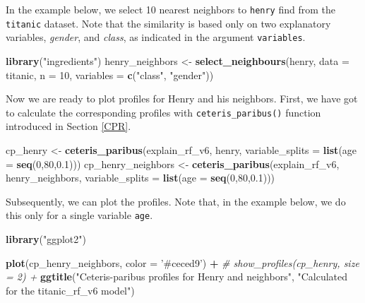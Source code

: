\documentclass[12pt,]{krantz}
\newenvironment{Shaded}{\begin{snugshade}}{\end{snugshade}}
\newcommand{\CommentTok}[1]{\textcolor[rgb]{0.56,0.35,0.01}{\textit{#1}}}
\newcommand{\DataTypeTok}[1]{\textcolor[rgb]{0.13,0.29,0.53}{#1}}
\newcommand{\DecValTok}[1]{\textcolor[rgb]{0.00,0.00,0.81}{#1}}
\newcommand{\FloatTok}[1]{\textcolor[rgb]{0.00,0.00,0.81}{#1}}
\newcommand{\KeywordTok}[1]{\textcolor[rgb]{0.13,0.29,0.53}{\textbf{#1}}}
\newcommand{\NormalTok}[1]{#1}
\newcommand{\OperatorTok}[1]{\textcolor[rgb]{0.81,0.36,0.00}{\textbf{#1}}}
\newcommand{\StringTok}[1]{\textcolor[rgb]{0.31,0.60,0.02}{#1}}
\begin{document}
In the example below, we select 10 nearest neighbors to \texttt{henry} find from the \texttt{titanic} dataset. Note that the similarity is based only on two explanatory variables, \emph{gender}, and \emph{class}, as indicated in the argument \texttt{variables}.

\begin{Shaded}
\begin{Highlighting}[]
\KeywordTok{library}\NormalTok{(}\StringTok{"ingredients"}\NormalTok{)}
\NormalTok{henry_neighbors <-}\StringTok{ }\KeywordTok{select_neighbours}\NormalTok{(henry, }
                         \DataTypeTok{data =}\NormalTok{ titanic, }
                         \DataTypeTok{n =} \DecValTok{10}\NormalTok{, }
                         \DataTypeTok{variables =} \KeywordTok{c}\NormalTok{(}\StringTok{"class"}\NormalTok{, }\StringTok{"gender"}\NormalTok{))}
\end{Highlighting}
\end{Shaded}

Now we are ready to plot profiles for Henry and his neighbors. First, we have got to calculate the corresponding profiles with \texttt{ceteris\_paribus()} function introduced in Section \ref{CPR}.

\begin{Shaded}
\begin{Highlighting}[]
\NormalTok{cp_henry <-}\StringTok{ }\KeywordTok{ceteris_paribus}\NormalTok{(explain_rf_v6, }
\NormalTok{                            henry,}
                            \DataTypeTok{variable_splits =} \KeywordTok{list}\NormalTok{(}\DataTypeTok{age =} \KeywordTok{seq}\NormalTok{(}\DecValTok{0}\NormalTok{,}\DecValTok{80}\NormalTok{,}\FloatTok{0.1}\NormalTok{)))}
\NormalTok{cp_henry_neighbors <-}\StringTok{ }\KeywordTok{ceteris_paribus}\NormalTok{(explain_rf_v6, }
\NormalTok{                            henry_neighbors,}
                            \DataTypeTok{variable_splits =} \KeywordTok{list}\NormalTok{(}\DataTypeTok{age =} \KeywordTok{seq}\NormalTok{(}\DecValTok{0}\NormalTok{,}\DecValTok{80}\NormalTok{,}\FloatTok{0.1}\NormalTok{)))}
\end{Highlighting}
\end{Shaded}

Subsequently, we can plot the profiles. Note that, in the example below, we do this only for a single variable \texttt{age}.

\begin{Shaded}
\begin{Highlighting}[]
\KeywordTok{library}\NormalTok{(}\StringTok{"ggplot2"}\NormalTok{)}

\KeywordTok{plot}\NormalTok{(cp_henry_neighbors, }\DataTypeTok{color =} \StringTok{'#ceced9'}\NormalTok{) }\OperatorTok{+}
\CommentTok{#  show_profiles(cp_henry, size = 2)  +}
\StringTok{  }\KeywordTok{ggtitle}\NormalTok{(}\StringTok{"Ceteris-paribus profiles for Henry and neighbors"}\NormalTok{, }\StringTok{"Calculated for the titanic_rf_v6 model"}\NormalTok{)}
\end{Highlighting}
\end{Shaded}
\end{document}

